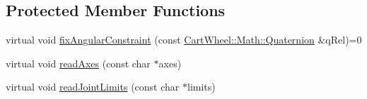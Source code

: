 \subsection*{Protected Member Functions}
\begin{DoxyCompactItemize}
\item 
virtual void \hyperlink{classCartWheel_1_1Physics_1_1Joint_ab14f1e87562d9f5993504621d2cf3569}{fixAngularConstraint} (const \hyperlink{classCartWheel_1_1Math_1_1Quaternion}{CartWheel::Math::Quaternion} \&qRel)=0
\item 
virtual void \hyperlink{classCartWheel_1_1Physics_1_1Joint_a30ecfb4d75270a399661552df87c01de}{readAxes} (const char $\ast$axes)
\item 
virtual void \hyperlink{classCartWheel_1_1Physics_1_1Joint_a3a70bb2e447b5acd7997545d3751a423}{readJointLimits} (const char $\ast$limits)
\end{DoxyCompactItemize}
